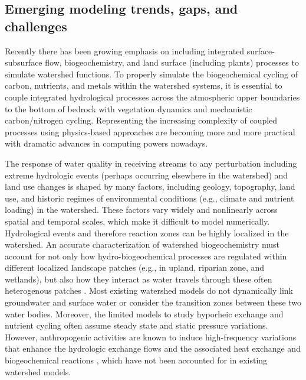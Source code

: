 \documentclass[preprint,review, 12pt]{elsarticle}
\begin{document}
\subsection{Emerging modeling trends, gaps, and challenges}

 Recently there has been growing emphasis on including integrated surface-subsurface flow, biogeochemistry, and land surface (including plants) processes to simulate watershed functions. To properly simulate the biogeochemical cycling of carbon, nutrients, and metals within the watershed systems, it is essential to couple integrated hydrological processes across the atmospheric upper boundaries to the bottom of bedrock with vegetation dynamics and mechanistic carbon/nitrogen cycling. Representing the increasing complexity of coupled processes using physics-based approaches are becoming more and more practical with dramatic advances in computing powers nowadays.  
 
 The response of water quality in receiving streams to any perturbation including extreme hydrologic events (perhaps occurring elsewhere in the watershed) and land use changes is shaped by many factors, including geology, topography, land use, and historic regimes of environmental conditions (e.g., climate and nutrient loading) in the watershed. These factors vary widely and nonlinearly across spatial and temporal scales, which make it difficult to model numerically. Hydrological events \citep{Lu2017a} and therefore reaction zones \citep{McClain2003} can be highly localized in the watershed. An accurate characterization of watershed biogeochemistry must account for not only how hydro-biogeochemical processes are regulated within different localized landscape patches (e.g., in upland, riparian zone, and wetlands), but also how they interact as water travels through these often heterogenous patches \citep{Laudon2018b}. Most existing watershed models do not dynamically link groundwater and surface water or consider the transition zones between these two water bodies. Moreover, the limited models to study hyporheic exchange and nutrient cycling often assume steady state and static pressure variations. However, anthropogenic activities are known to induce high-frequency variations that enhance the hydrologic exchange flows and the associated heat exchange and biogeochemical reactions \citep{Shuai2019b,Song2018b}, which have not been accounted for in existing watershed models.
    
\end{document}
